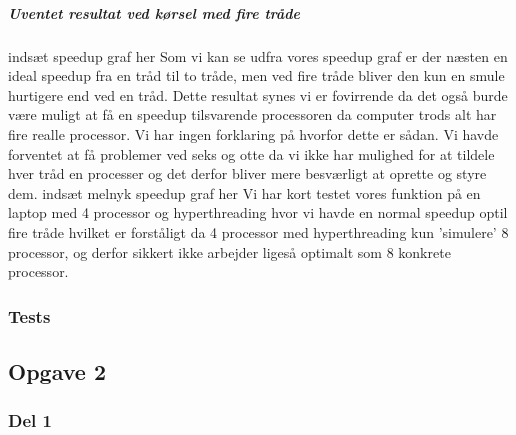 \subparagraph{Uventet resultat ved kørsel med fire tråde}
indsæt speedup graf her \n\n
Som vi kan se udfra vores speedup graf er der næsten en ideal speedup fra en tråd til to tråde, men ved fire tråde bliver den kun en smule hurtigere end ved en tråd. Dette resultat synes vi er fovirrende da det også burde være muligt at få en speedup tilsvarende processoren da computer trods alt har fire realle processor. Vi har ingen forklaring på hvorfor dette er sådan. 
Vi havde forventet at få problemer ved seks og otte da vi ikke har mulighed for at tildele hver tråd en processer og det derfor bliver mere besværligt at oprette og styre dem. 
indsæt melnyk speedup graf her \n\n
Vi har kort testet vores funktion på en laptop med 4 processor og hyperthreading hvor vi havde en normal speedup optil fire tråde hvilket er forståligt da 4 processor med hyperthreading kun 'simulere' 8 processor, og derfor sikkert ikke arbejder ligeså optimalt som 8 konkrete processor.

\subsubsection{Tests}
\label{O1_Tests}


\subsection{Opgave 2}
\label{O2}

\subsubsection{Del 1}
\label{O2_1}

